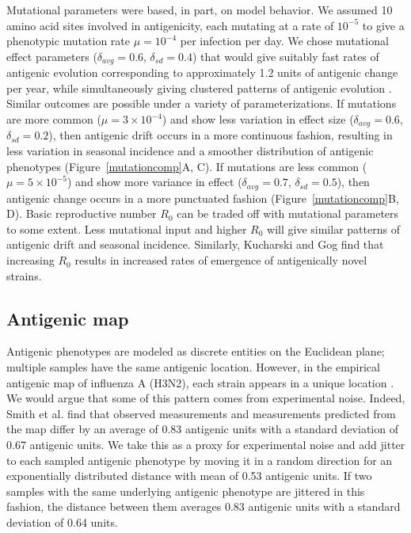 \documentclass[11pt,oneside,letterpaper]{article}
\begin{document}
Mutational parameters were based, in part, on model behavior.  We assumed 10 amino acid sites involved in antigenicity, each mutating at a rate of $10^{-5}$ \cite{Rambaut08} to give a phenotypic mutation rate $\mu = 10^{-4}$ per infection per day.  We chose mutational effect parameters ($\delta_{avg} = 0.6$, $\delta_{sd} = 0.4$) that would give suitably fast rates of antigenic evolution corresponding to approximately 1.2 units of antigenic change per year, while simultaneously giving clustered patterns of antigenic evolution  \cite{Smith04}.  Similar outcomes are possible under a variety of parameterizations.  If mutations are more common ($\mu = 3 \times 10^{-4}$) and show less variation in effect size ($\delta_{avg} = 0.6$, $\delta_{sd} = 0.2$), then antigenic drift occurs in a more continuous fashion, resulting in less variation in seasonal incidence and a smoother distribution of antigenic phenotypes (Figure~\ref{mutationcomp}A, C).  If mutations are less common ($\mu = 5 \times 10^{-5}$) and show more variance in effect ($\delta_{avg} = 0.7$, $\delta_{sd} = 0.5$), then antigenic change occurs in a more punctuated fashion (Figure~\ref{mutationcomp}B, D).  Basic reproductive number $R_0$ can be traded off with mutational parameters to some extent.  Less mutational input and higher $R_0$ will give similar patterns of antigenic drift and seasonal incidence.  Similarly, Kucharski and Gog \cite{Kucharski12} find that increasing $R_0$ results in increased rates of emergence of antigenically novel strains.

\subsection*{Antigenic map}

Antigenic phenotypes are modeled as discrete entities on the Euclidean plane; multiple samples have the same antigenic location.  However, in the empirical antigenic map of influenza A (H3N2), each strain appears in a unique location \cite{Smith04}.  We would argue that some of this pattern comes from experimental noise.  Indeed, Smith et al. \cite{Smith04} find that observed measurements and measurements predicted from the map differ by an average of 0.83 antigenic units with a standard deviation of 0.67 antigenic units.  We take this as a proxy for experimental noise and add jitter to each sampled antigenic phenotype by moving it in a random direction for an exponentially distributed distance with mean of 0.53 antigenic units.  If two samples with the same underlying antigenic phenotype are jittered in this fashion, the distance between them averages 0.83 antigenic units with a standard deviation of 0.64 units.
\end{document}
